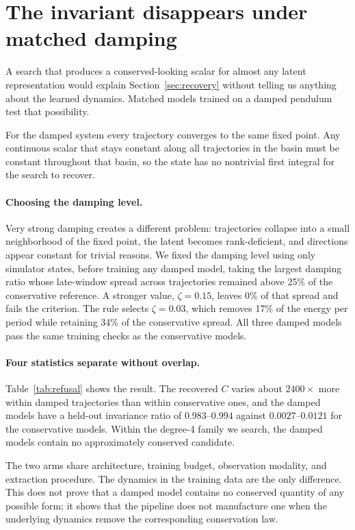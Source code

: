 \section{The invariant disappears under matched damping}
\label{sec:refusal}

A search that produces a conserved-looking scalar for almost any latent representation would explain
Section~\ref{sec:recovery} without telling us anything about the learned dynamics. Matched models
trained on a damped pendulum test that possibility.

For the damped system every trajectory converges to the same fixed point. Any continuous scalar that
stays constant along all trajectories in the basin must be constant throughout that basin, so the
state has no nontrivial first integral for the search to recover.

\paragraph{Choosing the damping level.} Very strong damping creates a different problem: trajectories
collapse into a small neighborhood of the fixed point, the latent becomes rank-deficient, and
directions appear constant for trivial reasons. We fixed the damping level using only simulator
states, before training any damped model, taking the largest damping ratio whose late-window spread
across trajectories remained above 25\% of the conservative reference. A stronger value,
$\zeta=0.15$, leaves 0\% of that spread and fails the criterion. The rule selects $\zeta=0.03$,
which removes 17\% of the energy per period while retaining 34\% of the conservative spread. All
three damped models pass the same training checks as the conservative models.

\paragraph{Four statistics separate without overlap.} Table~\ref{tab:refusal} shows the result. The
recovered $C$ varies about $2400\times$ more within damped trajectories than within conservative
ones, and the damped models have a held-out invariance ratio of $0.983$--$0.994$ against
$0.0027$--$0.0121$ for the conservative models. Within the degree-4 family we search, the damped
models contain no approximately conserved candidate.

The two arms share architecture, training budget, observation modality, and extraction procedure.
The dynamics in the training data are the only difference. This does not prove that a damped model
contains no conserved quantity of any possible form; it shows that the pipeline does not manufacture
one when the underlying dynamics remove the corresponding conservation law.

